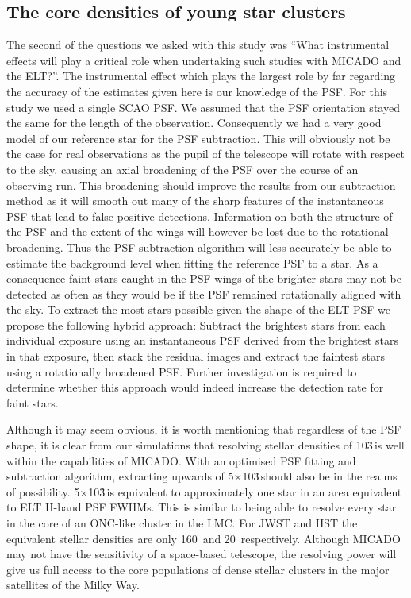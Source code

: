 \subsection{The core densities of young star clusters}

The second of the questions we asked with this study was ``What instrumental effects will play a critical role when undertaking such studies with MICADO and the ELT?''. 
The instrumental effect which plays the largest role by far regarding the accuracy of the estimates given here is our knowledge of the PSF.
For this study we used a single SCAO PSF. 
We assumed that the PSF orientation stayed the same for the length of the observation.
Consequently we had a very good model of our reference star for the PSF subtraction. 
This will obviously not be the case for real observations as the pupil of the telescope will rotate with respect to the sky, causing an axial broadening of the PSF over the course of an observing run. 
This broadening should improve the results from our subtraction method as it will smooth out many of the sharp features of the instantaneous PSF that lead to false positive detections. 
Information on both the structure of the PSF and the extent of the wings will however be lost due to the rotational broadening. 
Thus the PSF subtraction algorithm will less accurately be able to estimate the background level when fitting the reference PSF to a star. 
As a consequence faint stars caught in the PSF wings of the brighter stars may not be detected as often as they would be if the PSF remained rotationally aligned with the sky. 
To extract the most stars possible given the shape of the ELT PSF we propose the following hybrid approach: Subtract the brightest stars from each individual exposure using an instantaneous PSF derived from the brightest stars in that exposure, then stack the residual images and extract the faintest stars using a rotationally broadened PSF.
Further investigation is required to determine whether this approach would indeed increase the detection rate for faint stars.\rewrite

Although it may seem obvious, it is worth mentioning that regardless of the PSF shape, it is clear from our simulations that resolving stellar densities of 10\h3\,\spa is well within the capabilities of MICADO. 
With an optimised PSF fitting and subtraction algorithm, extracting upwards of 5$\times$10\h3\,\spa should also be in the realms of possibility. 
5$\times$10\h3\,\spa is equivalent to approximately one star in an area equivalent to  ELT H-band PSF FWHMs. 
This is similar to being able to resolve every star in the core of an ONC-like cluster in the LMC. 
For JWST and HST the equivalent stellar densities are only 160~\spa and 20~\spa respectively. 
Although MICADO may not have the sensitivity of a space-based telescope, the resolving power will give us full access to the core populations of dense stellar clusters in the major satellites of the Milky Way.


